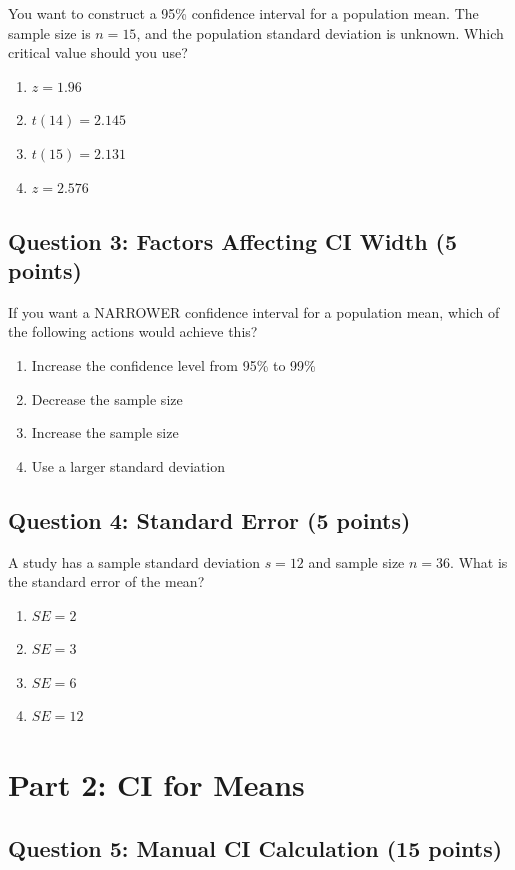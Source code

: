 \documentclass[11pt]{article}
\begin{document}
You want to construct a 95\% confidence interval for a population mean. The sample size is $n = 15$, and the population standard deviation is unknown. Which critical value should you use?

\begin{enumerate}[label=\alph*)]
\item $z = 1.96$
\item $t(14) = 2.145$
\item $t(15) = 2.131$
\item $z = 2.576$
\end{enumerate}

\subsection*{Question 3: Factors Affecting CI Width (5 points)}

If you want a NARROWER confidence interval for a population mean, which of the following actions would achieve this?

\begin{enumerate}[label=\alph*)]
\item Increase the confidence level from 95\% to 99\%
\item Decrease the sample size
\item Increase the sample size
\item Use a larger standard deviation
\end{enumerate}

\subsection*{Question 4: Standard Error (5 points)}

A study has a sample standard deviation $s = 12$ and sample size $n = 36$. What is the standard error of the mean?

\begin{enumerate}[label=\alph*)]
\item $SE = 2$
\item $SE = 3$
\item $SE = 6$
\item $SE = 12$
\end{enumerate}

\section*{Part 2: CI for Means}

\subsection*{Question 5: Manual CI Calculation (15 points)}
\end{document}
